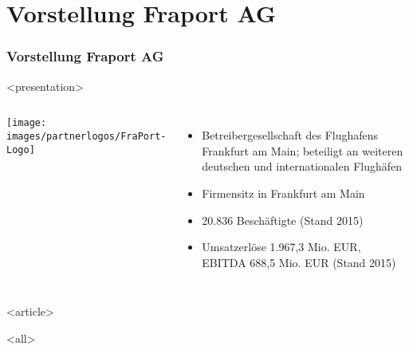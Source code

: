 

\section{Vorstellung Fraport AG}

\begin{frame}[fragile]
\frametitle<presentation>{Vorstellung Fraport AG}




\mode
<presentation>
\begin{columns}
\texttt{[image: images/partnerlogos/FraPort-Logo]}
\begin{itemize}
 \item Betreibergesellschaft des Flughafens Frankfurt am Main; beteiligt an weiteren deutschen und internationalen Flughäfen
 \item Firmensitz in Frankfurt am Main
 \item 20.836 Beschäftigte (Stand 2015)
 \item Umsatzerlöse 1.967,3 Mio. EUR, EBITDA 688,5 Mio. EUR (Stand 2015)
\end{itemize}
\end{columns}

\mode
<article>


\mode
<all>

\end{frame}
\newpage
\clearpage
